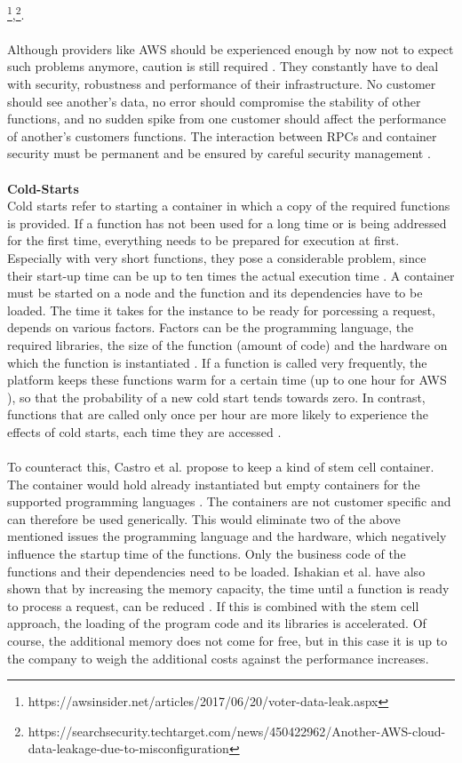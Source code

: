 \documentclass[11pt]{article}
\begin{document}
\footnote{https://awsinsider.net/articles/2017/06/20/voter-data-leak.aspx},\footnote{https://searchsecurity.techtarget.com/news/450422962/Another-AWS-cloud-data-leakage-due-to-misconfiguration}.\\\\ Although providers like AWS should be experienced enough by now not to expect such problems anymore, caution is still required \cite{fowler2018serverless}. They constantly have to deal with security, robustness and performance of their infrastructure. No customer should see another's data, no error should compromise the stability of other functions, and no sudden spike from one customer should affect the performance of another's customers functions. The interaction between RPCs and container security must be permanent and be ensured by careful security management \cite{mcgrath2017serverless}.\\\\ \textbf{Cold-Starts}\\ Cold starts refer to starting a container in which a copy of the required functions is provided. If a function has not been used for a long time or is being addressed for the first time, everything needs to be prepared for execution at first. Especially with very short functions, they pose a considerable problem, since their start-up time can be up to ten times the actual execution time \cite{shahrad2019architectural}. A container must be started on a node and the function and its dependencies have to be loaded. The time it takes for the instance to be ready for porcessing a request, depends on various factors. Factors can be the programming language, the required libraries, the size of the function (amount of code) and the hardware on which the function is instantiated \cite{shafiei2020serverless} \cite{jonas2019cloud}. If a function is called very frequently, the platform keeps these functions \glqq warm\grqq{} for a certain time (up to one hour for AWS \cite{roberts2017serverless}), so that the probability of a new cold start tends towards zero. In contrast, functions that are called only once per hour are more likely to experience the effects of cold starts, each time they are accessed \cite{roberts2017serverless}.\\\\ To counteract this, Castro et al. propose to keep a kind of stem cell container. The container would hold already instantiated but empty containers for the supported programming languages \cite{castro2019server}. The containers are not customer specific and can therefore be used generically. This would eliminate two of the above mentioned issues the programming language and the hardware, which negatively influence the startup time of the functions. Only the business code of the functions and their dependencies need to be loaded. Ishakian et al. have also shown that by increasing the memory capacity, the time until a function is ready to process a request, can be reduced \cite{ishakian2018serving}. If this is combined with the stem cell approach, the loading of the program code and its libraries is accelerated. Of course, the additional memory does not come for free, but in this case it is up to the company to weigh the additional costs against the performance increases.
\end{document}

